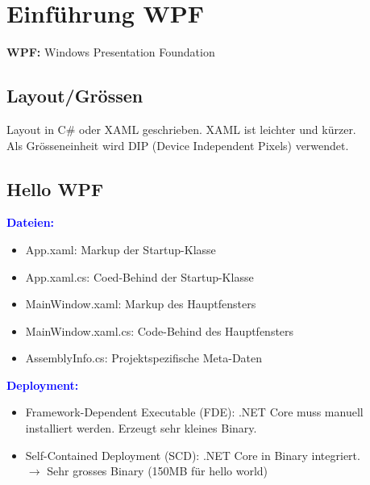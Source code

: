 
\section{Einführung WPF}
\textbf{WPF:} Windows Presentation Foundation
\subsection{Layout/Grössen}
Layout in C\# oder XAML geschrieben. XAML ist leichter und kürzer.\\
Als Grösseneinheit wird DIP (Device Independent Pixels) verwendet.
\subsection{Hello WPF}
\textbf{\textcolor{blue}{Dateien:}}
\begin{itemize}[topsep=0pt, leftmargin=4mm]
    \setlength\itemsep{-0.3em}
    \item App.xaml: Markup der Startup-Klasse
    \item App.xaml.cs: Coed-Behind der Startup-Klasse
    \item MainWindow.xaml: Markup des Hauptfensters
    \item MainWindow.xaml.cs: Code-Behind des Hauptfensters
    \item AssemblyInfo.cs: Projektspezifische Meta-Daten
\end{itemize}
\textbf{\textcolor{blue}{Deployment:}}
\begin{itemize}[topsep=0pt, leftmargin=4mm]
    \setlength\itemsep{-0.3em}
    \item Framework-Dependent Executable (FDE): .NET Core muss manuell installiert werden. Erzeugt sehr kleines Binary.
    \item Self-Contained Deployment (SCD): .NET Core in Binary integriert.\\
    $\rightarrow$ Sehr grosses Binary (150MB für hello world)
\end{itemize}